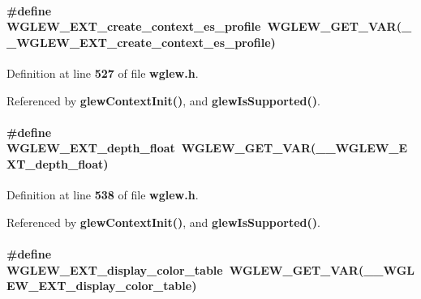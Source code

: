 \paragraph[{W\+G\+L\+E\+W\+\_\+\+E\+X\+T\+\_\+create\+\_\+context\+\_\+es\+\_\+profile}]{\setlength{\rightskip}{0pt plus 5cm}\#define W\+G\+L\+E\+W\+\_\+\+E\+X\+T\+\_\+create\+\_\+context\+\_\+es\+\_\+profile~{\bf W\+G\+L\+E\+W\+\_\+\+G\+E\+T\+\_\+\+V\+AR}({\bf \+\_\+\+\_\+\+W\+G\+L\+E\+W\+\_\+\+E\+X\+T\+\_\+create\+\_\+context\+\_\+es\+\_\+profile})}\label{wglew_8h_a8222a254f15bc233ce6e37420a22cff3}


Definition at line {\bf 527} of file {\bf wglew.\+h}.



Referenced by {\bf glew\+Context\+Init()}, and {\bf glew\+Is\+Supported()}.

\paragraph[{W\+G\+L\+E\+W\+\_\+\+E\+X\+T\+\_\+depth\+\_\+float}]{\setlength{\rightskip}{0pt plus 5cm}\#define W\+G\+L\+E\+W\+\_\+\+E\+X\+T\+\_\+depth\+\_\+float~{\bf W\+G\+L\+E\+W\+\_\+\+G\+E\+T\+\_\+\+V\+AR}({\bf \+\_\+\+\_\+\+W\+G\+L\+E\+W\+\_\+\+E\+X\+T\+\_\+depth\+\_\+float})}\label{wglew_8h_a28243aa0b3dc4657e072cf89aae50e26}


Definition at line {\bf 538} of file {\bf wglew.\+h}.



Referenced by {\bf glew\+Context\+Init()}, and {\bf glew\+Is\+Supported()}.

\paragraph[{W\+G\+L\+E\+W\+\_\+\+E\+X\+T\+\_\+display\+\_\+color\+\_\+table}]{\setlength{\rightskip}{0pt plus 5cm}\#define W\+G\+L\+E\+W\+\_\+\+E\+X\+T\+\_\+display\+\_\+color\+\_\+table~{\bf W\+G\+L\+E\+W\+\_\+\+G\+E\+T\+\_\+\+V\+AR}({\bf \+\_\+\+\_\+\+W\+G\+L\+E\+W\+\_\+\+E\+X\+T\+\_\+display\+\_\+color\+\_\+table})}\label{wglew_8h_aab47183156b8775b69785508c4e9e4a7}


